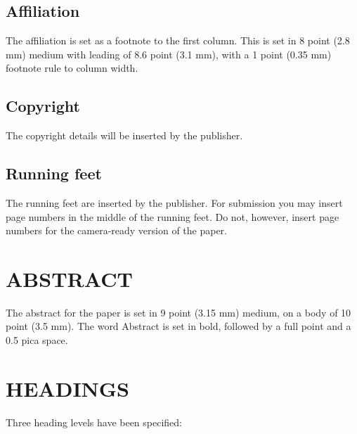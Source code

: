 \documentclass{ecai}
\begin{document}
\subsection{Affiliation}
The affiliation is set as a footnote to the first column. This is set
in 8 point (2.8 mm) medium with leading of 8.6 point (3.1 mm), with a
1 point (0.35 mm) footnote rule to column width.

\subsection{Copyright}
The copyright details will be inserted by the publisher.

\subsection{Running feet}
The running feet are inserted by the publisher. For submission you may
insert page numbers in the middle of the running feet. Do not,
however, insert page numbers for the camera-ready version of the
paper.

\section{ABSTRACT}
The abstract for the paper is set in 9 point (3.15 mm) medium, on a
body of 10 point (3.5 mm). The word Abstract is set in bold, followed
by a full point and a 0.5 pica space.

\section{HEADINGS}\label{heads}
Three heading levels have been specified:
\end{document}
